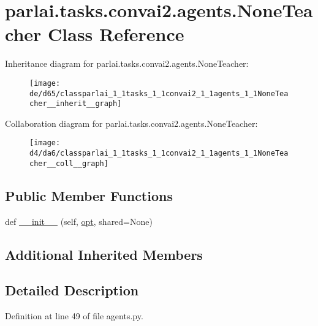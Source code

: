 \hypertarget{classparlai_1_1tasks_1_1convai2_1_1agents_1_1NoneTeacher}{}\section{parlai.\+tasks.\+convai2.\+agents.\+None\+Teacher Class Reference}
\label{classparlai_1_1tasks_1_1convai2_1_1agents_1_1NoneTeacher}


Inheritance diagram for parlai.\+tasks.\+convai2.\+agents.\+None\+Teacher\+:\nopagebreak
\begin{figure}[H]
\begin{center}
\leavevmode
\texttt{[image: de/d65/classparlai\_1\_1tasks\_1\_1convai2\_1\_1agents\_1\_1NoneTeacher\_\_inherit\_\_graph]}
\end{center}
\end{figure}


Collaboration diagram for parlai.\+tasks.\+convai2.\+agents.\+None\+Teacher\+:\nopagebreak
\begin{figure}[H]
\begin{center}
\leavevmode
\texttt{[image: d4/da6/classparlai\_1\_1tasks\_1\_1convai2\_1\_1agents\_1\_1NoneTeacher\_\_coll\_\_graph]}
\end{center}
\end{figure}
\subsection*{Public Member Functions}
\begin{DoxyCompactItemize}
\item 
def \hyperlink{classparlai_1_1tasks_1_1convai2_1_1agents_1_1NoneTeacher_ab4fbfba45b52e37ca3293273880b56e6}{\+\_\+\+\_\+init\+\_\+\+\_\+} (self, \hyperlink{classparlai_1_1core_1_1teachers_1_1FbDialogTeacher_af7a9ec497b9cd0292d7b8fa220da7c28}{opt}, shared=None)
\end{DoxyCompactItemize}
\subsection*{Additional Inherited Members}


\subsection{Detailed Description}


Definition at line 49 of file agents.\+py.



